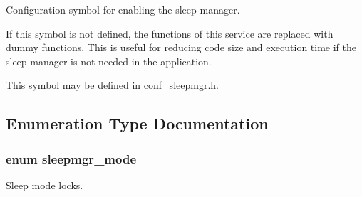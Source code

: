 \-Configuration symbol for enabling the sleep manager. 

\-If this symbol is not defined, the functions of this service are replaced with dummy functions. \-This is useful for reducing code size and execution time if the sleep manager is not needed in the application.

\-This symbol may be defined in \hyperlink{conf__sleepmgr_8h}{conf\-\_\-sleepmgr.\-h}. 

\subsection{\-Enumeration \-Type \-Documentation}
\hypertarget{group__sleepmgr__group_gaa990bc3ea16fcad09009cdc70dbc38c6}{
\subsubsection[{sleepmgr\-\_\-mode}]{\setlength{\rightskip}{0pt plus 5cm}enum {\bf sleepmgr\-\_\-mode}}}
\label{group__sleepmgr__group_gaa990bc3ea16fcad09009cdc70dbc38c6}


\-Sleep mode locks. 

